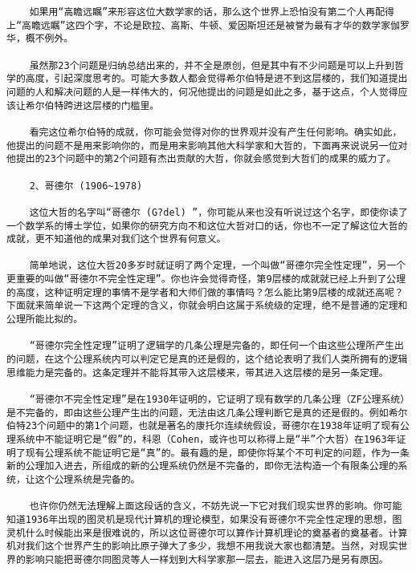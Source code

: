 \begin{verbatim}
    如果用“高瞻远瞩”来形容这位大数学家的话，那么这个世界上恐怕没有第二个人再配得上“高瞻远瞩”这四个字，不论是欧拉、高斯、牛顿、爱因斯坦还是被誉为最有才华的数学家伽罗华，概不例外。

    虽然那23个问题是归纳总结出来的，并不全是原创，但是其中有不少问题是可以上升到哲学的高度，引起深度思考的。可能大多数人都会觉得希尔伯特是进不到这层楼的，我们知道提出问题的人和解决问题的人是一样伟大的，何况他提出的问题是如此之多，基于这点，个人觉得应该让希尔伯特跨进这层楼的门槛里。

    看完这位希尔伯特的成就，你可能会觉得对你的世界观并没有产生任何影响。确实如此，他提出的问题不是用来影响你的，而是用来影响其他大科学家和大哲的，下面再来说说另一位对他提出的23个问题中的第2个问题有杰出贡献的大哲，你就会感觉到大哲们的成果的威力了。

    2、哥德尔 (1906~1978)

    这位大哲的名字叫“哥德尔 (G?del) ”，你可能从来也没有听说过这个名字，即使你读了一个数学系的博士学位，如果你的研究方向不和这位大哲对口的话，你也不一定了解这位大哲的成就，更不知道他的成果对我们这个世界有何意义。

    简单地说，这位大哲20多岁时就证明了两个定理，一个叫做“哥德尔完全性定理”，另一个更重要的叫做“哥德尔不完全性定理”。你也许会觉得奇怪，第9层楼的成就就已经上升到了公理的高度，这种证明定理的事情不是学者和大师们做的事情吗？怎么能比第9层楼的成就还高呢？下面就来简单说一下这两个定理的含义，你就会明白这属于系统级的定理，绝不是普通的定理和公理所能比拟的。

    “哥德尔完全性定理”证明了逻辑学的几条公理是完备的，即任何一个由这些公理所产生出的问题，在这个公理系统内可以判定它是真的还是假的，这个结论表明了我们人类所拥有的逻辑思维能力是完备的。这条定理并不能将其带入这层楼来，带其进入这层楼的是另一条定理。

    “哥德尔不完全性定理”是在1930年证明的，它证明了现有数学的几条公理（ZF公理系统）是不完备的，即由这些公理产生出的问题，无法由这几条公理判断它是真的还是假的。例如希尔伯特23个问题中的第1个问题，也就是著名的康托尔连续统假设，哥德尔在1938年证明了现有公理系统中不能证明它是“假”的，科恩（Cohen，或许也可以称得上是“半”个大哲）在1963年证明了现有公理系统不能证明它是“真”的。最有趣的是，即使你将某个不可判定的问题，作为一条新的公理加入进去，所组成的新的公理系统仍然是不完备的，即你无法构造一个有限条公理的系统，让这个公理系统是完备的。

    也许你仍然无法理解上面这段话的含义，不妨先说一下它对我们现实世界的影响。你可能知道1936年出现的图灵机是现代计算机的理论模型，如果没有哥德尔不完全性定理的思想，图灵机什么时候能出来是很难说的，所以这位哥德尔可以算作计算机理论的奠基者的奠基者。计算机对我们这个世界产生的影响比原子弹大了多少，我想不用我说大家也都清楚。当然，对现实世界的影响只能把哥德尔同图灵等人一样划到大科学家那一层去，能进入这层乃是另有原因。


\end{verbatim}
